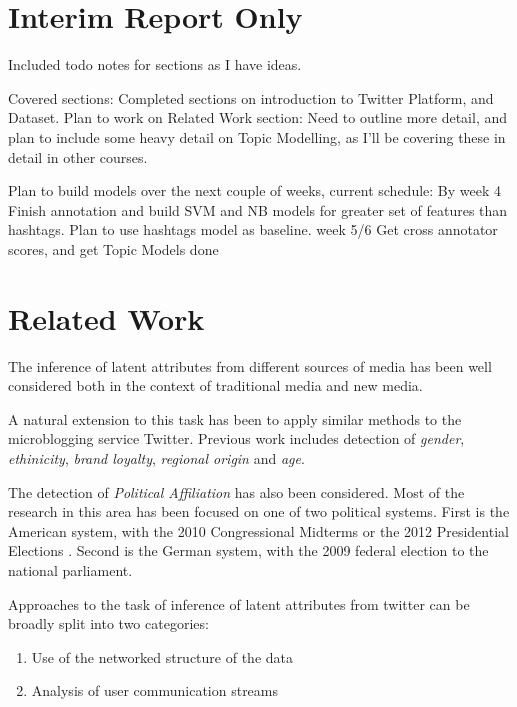 \documentclass[bsc,frontabs,singlespacing,parskip]{infthesis}     %
\begin{document}
\chapter{Interim Report Only}
Included todo notes for sections as I have ideas.

Covered sections:
Completed sections on introduction to Twitter Platform, and Dataset. 
Plan to work on Related Work section: Need to outline more detail, and plan to include some heavy detail on Topic Modelling, as I'll be covering these in detail in other courses. 

Plan to build models over the next couple of weeks, current schedule:
By week 4 Finish annotation and build SVM and NB models for greater set of features than hashtags. Plan to use hashtags model as baseline. 
week 5/6 Get cross annotator scores, and get Topic Models done




\chapter{Related Work}

The inference of latent attributes from different sources of media has been well considered both in the context of traditional media and new media. 

A natural extension to this task has been to apply similar methods to the microblogging service Twitter. Previous work includes detection of \textit{gender}, \textit{ethinicity}, \textit{brand loyalty}, \textit{regional origin} and \textit{age}.\cite{yahoopaper}\cite{rao2010}

The detection of \textit{Political Affiliation} has also been considered. Most of the research in this area has been focused on one of two political systems. First is the American system, with the 2010 Congressional Midterms\cite{Conover2010predicting}  \cite{politicalpolar}\cite{yahoopaper} or the 2012 Presidential Elections \cite{quantpol}. Second is the German system, with the 2009 federal election to the national parliament\cite{predelections}\cite{dividedtheytweet}. 

Approaches to the task of inference of latent attributes from twitter can be broadly split into two categories:
\begin{enumerate}
\item{Use of the networked structure of the data}
\item{Analysis of user communication streams}
\end{enumerate}
\end{document}
